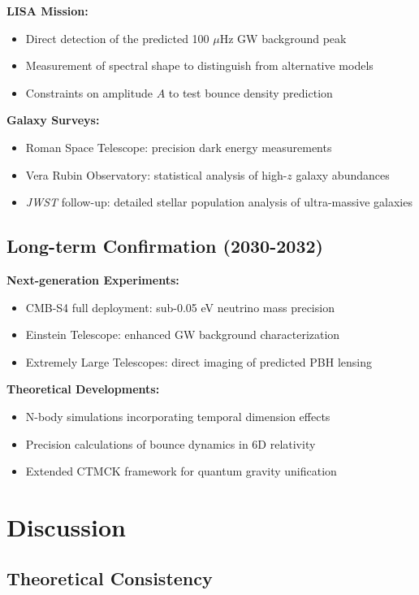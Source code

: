 \documentclass[reprint,amsmath,amssymb,aps,prd,nofootinbib,longbibliography]{revtex4-2}
\begin{document}
\textbf{LISA Mission:}
\begin{itemize}
\item Direct detection of the predicted 100 $\mu$Hz GW background peak
\item Measurement of spectral shape to distinguish from alternative models
\item Constraints on amplitude $A$ to test bounce density prediction
\end{itemize}

\textbf{Galaxy Surveys:}
\begin{itemize}
\item Roman Space Telescope: precision dark energy measurements
\item Vera Rubin Observatory: statistical analysis of high-$z$ galaxy abundances
\item \textit{JWST} follow-up: detailed stellar population analysis of ultra-massive galaxies
\end{itemize}

\subsection{Long-term Confirmation (2030-2032)}

\textbf{Next-generation Experiments:}
\begin{itemize}
\item CMB-S4 full deployment: sub-0.05 eV neutrino mass precision
\item Einstein Telescope: enhanced GW background characterization
\item Extremely Large Telescopes: direct imaging of predicted PBH lensing
\end{itemize}

\textbf{Theoretical Developments:}
\begin{itemize}
\item N-body simulations incorporating temporal dimension effects
\item Precision calculations of bounce dynamics in 6D relativity
\item Extended CTMCK framework for quantum gravity unification
\end{itemize}

\section{Discussion}

\subsection{Theoretical Consistency}
\end{document}
